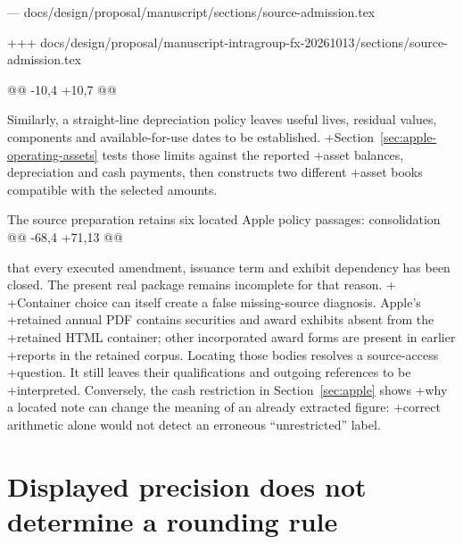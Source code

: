 --- docs/design/proposal/manuscript/sections/source-admission.tex

+++ docs/design/proposal/manuscript-intragroup-fx-20261013/sections/source-admission.tex

@@ -10,4 +10,7 @@

 Similarly, a straight-line depreciation policy leaves useful lives, residual
 values, components and available-for-use dates to be established.
+Section~\ref{sec:apple-operating-assets} tests those limits against the reported
+asset balances, depreciation and cash payments, then constructs two different
+asset books compatible with the selected amounts.
 
 The source preparation retains six located Apple policy passages: consolidation
@@ -68,4 +71,13 @@

 that every executed amendment, issuance term and exhibit dependency has been
 closed. The present real package remains incomplete for that reason.
+
+Container choice can itself create a false missing-source diagnosis. Apple's
+retained annual PDF contains securities and award exhibits absent from the
+retained HTML container; other incorporated award forms are present in earlier
+reports in the retained corpus. Locating those bodies resolves a source-access
+question. It still leaves their qualifications and outgoing references to be
+interpreted. Conversely, the cash restriction in Section~\ref{sec:apple} shows
+why a located note can change the meaning of an already extracted figure:
+correct arithmetic alone would not detect an erroneous ``unrestricted'' label.
 
 \section{Displayed precision does not determine a rounding rule}
